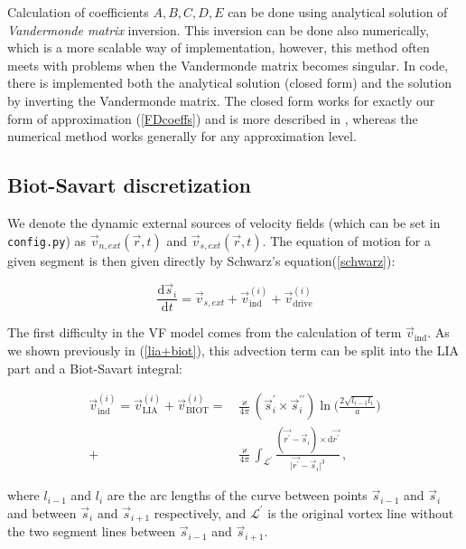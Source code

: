 Calculation of coefficients $A, B, C, D, E$ can be done using analytical solution of \textit{Vandermonde matrix} inversion. This inversion can be done also numerically, which is a more scalable way of implementation, however, this method often meets with problems when the Vandermonde matrix becomes singular.
In code, there is implemented both the analytical solution (closed form) and the solution by inverting the Vandermonde matrix. The closed form works for exactly our form of approximation (\ref{FDcoeffs}) and is more described in \cite{FDclosed}, whereas the numerical method works generally for any approximation level.

\subsection*{Biot-Savart discretization}

We denote the dynamic external sources of velocity fields (which can be set in \texttt{config.py}) as $\vec{v}_{n,ext}(\vec{r}, t)$ and $\vec{v}_{s,ext} (\vec{r}, t)$. The equation of motion for a given segment is then given directly by Schwarz's equation(\ref{schwarz}):

\begin{equation}
\frac{\text{d}\vec{s}_i}{\text{d}t} =
\vec{v}_{s,ext} + \vec{v}_{\text{ind}}^{(i)} + \vec{v}_{\text{drive}}^{(i)}
\end{equation}

The first difficulty in the VF model comes from the calculation of term $\vec{v}_{\text{ind}}$. As we shown previously in (\ref{lia+biot}), this advection term can be split into the LIA part and a Biot-Savart integral:

\begin{align}
\vec{v}_{\text{ind}}^{(i)} =
\vec{v}_{\text{LIA}}^{(i)} + \vec{v}_{\text{BIOT}}^{(i)} =&
\frac{\varkappa}{4\pi} (\vec{s}^{\prime}_i \times \vec{s}^{\prime \prime}_i)
\ln{\Bigg(\frac{2\sqrt{l_{i-1} l_i}}{a}\Bigg)}
\label{LIA}
\\
+& \frac{\varkappa}{4\pi} \int_{\mathcal{L}^{\prime}} \frac{(\vec{r^{\prime}} - \vec{s}_i) \times \text{d}\vec{r^{\prime}}}{\vert \vec{r^{\prime}} - \vec{s}_i \vert^3}\,,
\label{BIOT}
\end{align}

where $l_{i-1}$ and $l_i$ are the arc lengths of the curve between
points $\vec{s}_{i-1}$ and $\vec{s}_i$ and between $\vec{s}_i$ and $\vec{s}_{i+1}$ respectively, and $\mathcal{L}^{\prime}$ is the original vortex line without the two segment lines between $\vec{s}_{i-1}$ and $\vec{s}_{i+1}$.

